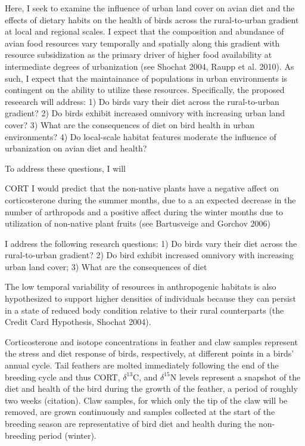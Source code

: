 \documentclass[12pt]{article}
\begin{document}

 Here, I seek to examine the influence of urban land cover on avian diet and the effects of dietary habits on the health of birds across the rural-to-urban gradient at local and regional scales. I expect that the composition and abundance of avian food resources vary temporally and spatially along this gradient with resource subsidization as the primary driver of higher food availability at intermediate degrees of urbanization (see Shochat 2004, Raupp et al. 2010). As such, I expect that the maintainance of populations in urban environments is contingent on the ability to utilize these resources. Specifically, the proposed reseearch will address:  1) Do birds vary their diet across the rural-to-urban gradient? 2) Do birds exhibit increased omnivory with increasing urban land cover? 3) What are the consequences of diet on bird health in  urban environments? 4) Do local-scale habitat features moderate the influence of urbanization on avian diet and health?

To address these questions, I will 

CORT
I would predict that the non-native plants have a negative affect on corticosterone during the summer months, due to a an expected decrease in the number of arthropods and a positive affect during the winter months due to utilization of non-native plant fruits (see Bartusveige and Gorchov 2006)

I address the following research questions: 1) Do birds vary their diet across the rural-to-urban gradient? 2) Do bird exhibit increased omnivory with increasing urban land cover; 3) What are the consequences of diet

The low temporal variability of resources in anthropogenic habitats is also hypothesized to support higher densities of individuals because they can persist in a state of reduced body condition relative to their rural counterparts (the Credit Card Hypothesis, Shochat 2004). 

Corticosterone and isotope concentrations in feather and claw samples represent the stress and diet response of birds, respectively, at different points in a birds' annual cycle. Tail feathers are molted immediately following the end of the breeding cycle and thus CORT, $\delta^{13}$C, and $\delta^{15}$N levels represent a snapshot of the diet and health of the bird during the growth of the feather, a period of roughly two weeks (citation). Claw samples, for which only the tip of the claw will be removed, are grown continuously and samples collected at the start of the breeding season are representative of bird diet and health during the non-breeding period (winter). 
\end{document}
